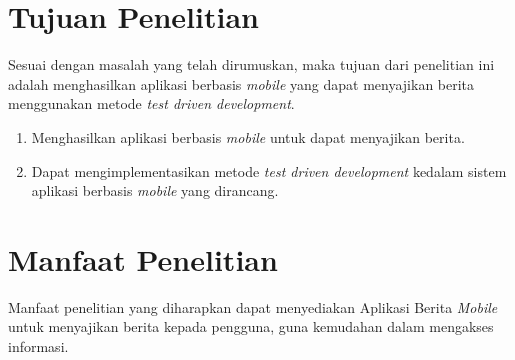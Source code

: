 \begin{spacing}{2}
\section{Tujuan Penelitian}
Sesuai dengan masalah yang telah dirumuskan, maka tujuan dari penelitian ini adalah menghasilkan aplikasi berbasis \emph{mobile} yang dapat menyajikan berita menggunakan metode \emph{test driven development}.
\begin{enumerate}
  \item Menghasilkan aplikasi berbasis \emph{mobile} untuk dapat menyajikan berita.
  \item Dapat mengimplementasikan metode \emph{test driven development} kedalam sistem aplikasi berbasis \emph{mobile} yang dirancang.
\end{enumerate}


\section{Manfaat Penelitian}
Manfaat penelitian yang diharapkan dapat menyediakan Aplikasi Berita \emph{Mobile} untuk menyajikan berita kepada pengguna, guna kemudahan dalam mengakses informasi.

\end{spacing}
\begin{comment}

\end{comment}
